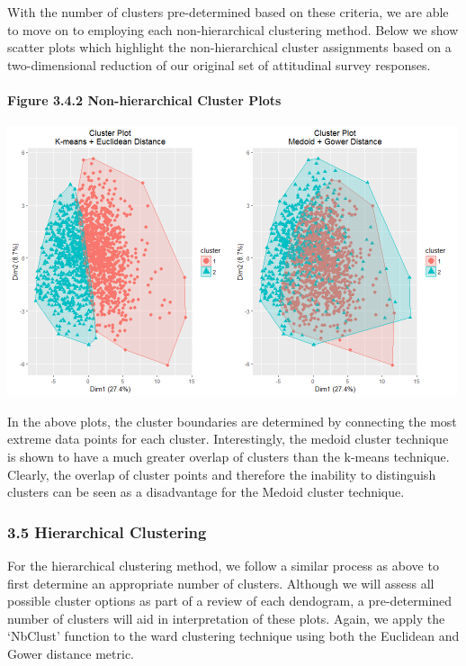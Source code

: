 \documentclass[]{article}
\let\oldparagraph\paragraph
\renewcommand{\paragraph}[1]{\oldparagraph{#1}\mbox{}}
\begin{document}
With the number of clusters pre-determined based on these criteria, we
are able to move on to employing each non-hierarchical clustering
method. Below we show scatter plots which highlight the non-hierarchical
cluster assignments based on a two-dimensional reduction of our original
set of attitudinal survey responses.

\paragraph{Figure 3.4.2 Non-hierarchical Cluster
Plots}\label{figure-3.4.2-non-hierarchical-cluster-plots}

\includegraphics[width=5.20833in]{images/nonhier_clust.png}

In the above plots, the cluster boundaries are determined by connecting
the most extreme data points for each cluster. Interestingly, the medoid
cluster technique is shown to have a much greater overlap of clusters
than the k-means technique. Clearly, the overlap of cluster points and
therefore the inability to distinguish clusters can be seen as a
disadvantage for the Medoid cluster technique.

\subsubsection{3.5 Hierarchical
Clustering}\label{hierarchical-clustering}

For the hierarchical clustering method, we follow a similar process as
above to first determine an appropriate number of clusters. Although we
will assess all possible cluster options as part of a review of each
dendogram, a pre-determined number of clusters will aid in
interpretation of these plots. Again, we apply the `NbClust' function to
the ward clustering technique using both the Euclidean and Gower
distance metric.
\end{document}
